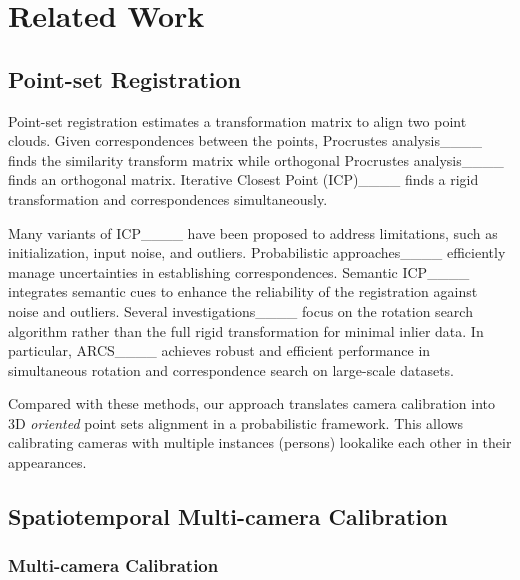 \section{Related Work}
\subsection{Point-set Registration} 

Point-set registration estimates a transformation matrix to align two point clouds. Given correspondences between the points, Procrustes analysis____ finds the similarity transform matrix while orthogonal Procrustes analysis____ finds an orthogonal matrix. Iterative Closest Point (ICP)____ finds a rigid transformation and correspondences simultaneously.


Many variants of ICP____ have been proposed to address limitations, such as initialization, input noise, and outliers.
Probabilistic approaches____ efficiently manage uncertainties in establishing correspondences. Semantic ICP____ integrates semantic cues to enhance the reliability of the registration against noise and outliers. Several investigations____ focus on the rotation search algorithm rather than the full rigid transformation for minimal inlier data. In particular, ARCS____ achieves robust and efficient performance in simultaneous rotation and correspondence search on large-scale datasets.



Compared with these methods, our approach translates camera calibration into 3D \textit{oriented} point sets alignment in a probabilistic framework.
%
This allows calibrating cameras with multiple instances (\eg persons) lookalike each other in their appearances.


\subsection{Spatiotemporal Multi-camera Calibration}

\subsubsection{Multi-camera Calibration} 

